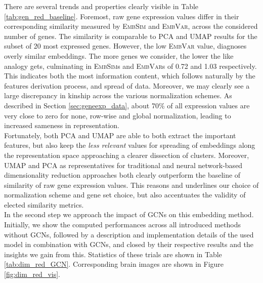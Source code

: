 \documentclass[]{article}
\begin{document}
There are several trends and properties clearly visible in Table \ref{tab:gen_red_baseline}. Foremost, raw gene expression values differ in their corresponding similarity measured by \textsc{EmbSim} and \textsc{EmbVar}, across the considered number of genes. The similarity is comparable to PCA and UMAP results for the subset of 20 most expressed genes. However, the low \textsc{EmbVar} value, diagnoses overly similar embeddings. The more genes we consider, the lower the like analogy gets, culminating in \textsc{EmbSim}s and \textsc{EmbVar}s of 0.72 and 1.03 respectively. This indicates both the most information content, which follows naturally by the features derivation process, and spread of data. 
Moreover, we may clearly see a large discrepancy in kinship across the various normalization schemes. As described in Section \ref{sec:geneexp_data}, about 70\% of all expression values are very close to zero for none, row-wise and global normalization, leading to increased sameness in representation. \\

Fortunately, both PCA and UMAP are able to both extract the important features, but also keep the \textit{less relevant} values for spreading of embeddings along the representation space approaching a clearer dissection of clusters. Moreover, UMAP and PCA as representatives for traditional and neural network-based dimensionality reduction approaches both clearly outperform the baseline of similarity of raw gene expression values. 
This reasons and underlines our choice of normalization scheme and gene set choice, but also accentuates the validity of elected similarity metrics.\\

In the second step we approach the impact of GCNs on this embedding method. Initially, we show the computed performances across all introduced methods without GCNs, followed by a description and implementation details of the used model in combination with GCNs, and closed by their respective results and the insights we gain from this. Statistics of these trials are shown in Table \ref{tab:dim_red_GCN}. Corresponding brain images are shown in Figure \ref{fig:dim_red_vis}.\\
\end{document}

